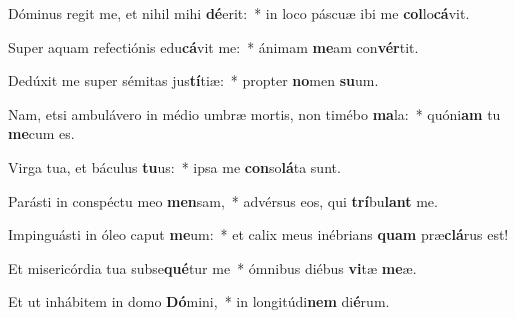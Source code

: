 \item Dóminus regit me, et nihil mihi \textbf{dé}erit:~* in loco páscuæ ibi me \textbf{col}lo\textbf{cá}vit.
\item Super aquam refectiónis edu\textbf{cá}vit me:~* ánimam \textbf{me}am con\textbf{vér}tit.
\item Dedúxit me super sémitas jus\textbf{tí}tiæ:~* propter \textbf{no}men \textbf{su}um.
\item Nam, etsi ambulávero in médio umbræ mortis, non timébo \textbf{ma}la:~* quóni\textbf{am} tu \textbf{me}cum es.
\item Virga tua, et báculus \textbf{tu}us:~* ipsa me \textbf{con}so\textbf{lá}ta sunt.
\item Parásti in conspéctu meo \textbf{men}sam,~* advérsus eos, qui \textbf{trí}bu\textbf{lant} me.
\item Impinguásti in óleo caput \textbf{me}um:~* et calix meus inébrians \textbf{quam} præ\textbf{clá}rus est!
\item Et misericórdia tua subse\textbf{qué}tur me~* ómnibus diébus \textbf{vi}tæ \textbf{me}æ.
\item Et ut inhábitem in domo \textbf{Dó}mini,~* in longitúdi\textbf{nem} di\textbf{é}rum.
